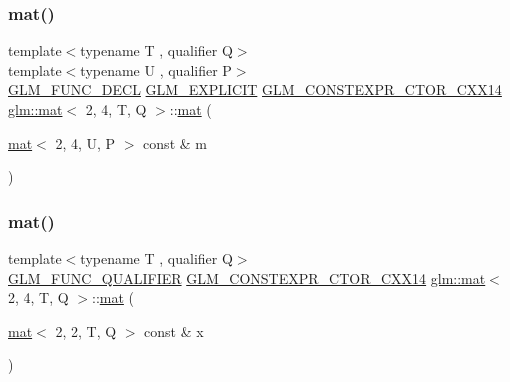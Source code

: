\mbox{\label{structglm_1_1mat_3_012_00_014_00_01_t_00_01_q_01_4_a9f8b14350b606e58d0bf69a7cd35bf45}} 
\subsubsection{\texorpdfstring{mat()}{mat()}\hspace{0.1cm}{\footnotesize\ttfamily [9/21]}}
{\footnotesize\ttfamily template$<$typename T , qualifier Q$>$ \\
template$<$typename U , qualifier P$>$ \\
\hyperlink{setup_8hpp_ab2d052de21a70539923e9bcbf6e83a51}{G\+L\+M\+\_\+\+F\+U\+N\+C\+\_\+\+D\+E\+CL} \hyperlink{setup_8hpp_a6c74f5a5e7b134ab69023ff9a30d4d5d}{G\+L\+M\+\_\+\+E\+X\+P\+L\+I\+C\+IT} \hyperlink{setup_8hpp_a0900f9145e68bf6061b6f5e7be3fa751}{G\+L\+M\+\_\+\+C\+O\+N\+S\+T\+E\+X\+P\+R\+\_\+\+C\+T\+O\+R\+\_\+\+C\+X\+X14} \hyperlink{structglm_1_1mat}{glm\+::mat}$<$ 2, 4, T, Q $>$\+::\hyperlink{structglm_1_1mat}{mat} (\begin{DoxyParamCaption}\item[{\hyperlink{structglm_1_1mat}{mat}$<$ 2, 4, U, P $>$ const \&}]{m }\end{DoxyParamCaption})}

\mbox{\label{structglm_1_1mat_3_012_00_014_00_01_t_00_01_q_01_4_a1248b3992782f755da5abbcd9ee09d0b}} 
\subsubsection{\texorpdfstring{mat()}{mat()}\hspace{0.1cm}{\footnotesize\ttfamily [10/21]}}
{\footnotesize\ttfamily template$<$typename T , qualifier Q$>$ \\
\hyperlink{setup_8hpp_a33fdea6f91c5f834105f7415e2a64407}{G\+L\+M\+\_\+\+F\+U\+N\+C\+\_\+\+Q\+U\+A\+L\+I\+F\+I\+ER} \hyperlink{setup_8hpp_a0900f9145e68bf6061b6f5e7be3fa751}{G\+L\+M\+\_\+\+C\+O\+N\+S\+T\+E\+X\+P\+R\+\_\+\+C\+T\+O\+R\+\_\+\+C\+X\+X14} \hyperlink{structglm_1_1mat}{glm\+::mat}$<$ 2, 4, T, Q $>$\+::\hyperlink{structglm_1_1mat}{mat} (\begin{DoxyParamCaption}\item[{\hyperlink{structglm_1_1mat}{mat}$<$ 2, 2, T, Q $>$ const \&}]{x }\end{DoxyParamCaption})}

